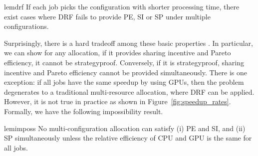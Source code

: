 \begin{restatable}[]{lem}{drf}
	\label{lem:drf_fail}
	If each job picks the configuration with shorter processing time, there exist cases where DRF fails to provide PE, SI or SP under multiple configurations.
\end{restatable}


Surprisingly, there is a hard tradeoff among these basic properties \cite{sun2018fair}. In particular, we can show for any allocation, if
it provides sharing incentive and Pareto efficiency, it cannot
be strategyproof. Conversely, if it is strategyproof, sharing
incentive and Pareto efficiency cannot be provided simultaneously.
There is one exception: if all jobs have the same speedup by using GPUs, then the problem degenerates to a traditional multi-resource allocation, where DRF can be applied. However, it is not true in practice as shown in Figure~\ref{fig:speedup_rates}. Formally, we have the following impossibility result.

\begin{restatable}[]{lem}{imposs}
\label{lem:imposs}
No multi-configuration allocation can satisfy (i) PE and SI, and (ii) SP simultaneously unless the relative efficiency of CPU and GPU is the same for all jobs. \end{restatable}



